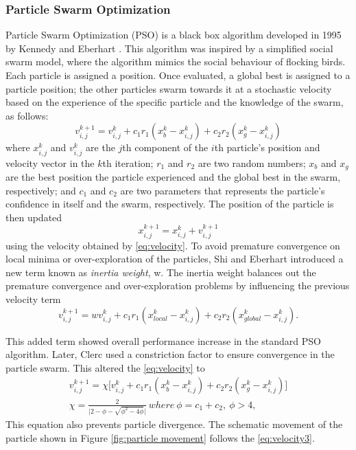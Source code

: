 \subsubsection{Particle Swarm Optimization}
Particle Swarm Optimization (PSO) is a black box algorithm developed in 1995 by Kennedy and Eberhart \cite{Kennedy1995}. This algorithm was inspired by a simplified social swarm model, where the algorithm mimics the social behaviour of flocking birds. Each particle is assigned a position. Once evaluated, a global best is assigned to a particle position; the other particles swarm towards it at a stochastic velocity based on the experience of the specific particle and the knowledge of the swarm, as follows: 
\begin{equation}
    \label{eq:velocity}
    v^{k+1}_{i,j} = v^{k}_{i,j} + c_1r_1(x^{k}_b - x^{k}_{i,j}) + c_2r_2(x^{k}_g - x^{k}_{i,j})
\end{equation}
where $x^k_{i,j}$ and $v^k_{i,j}$ are the $j$th component of the $i$th particle's position and velocity vector in the $k$th iteration; $r_1$ and $r_2$ are two random numbers; $x_b$ and $x_g$ are the best position the particle experienced and the global best in the swarm, respectively; and $c_1$ and $c_2$ are two parameters that represents the particle's confidence in itself and the swarm, respectively. The position of the particle is then updated
\begin{equation}
    \label{eq:position}
    x^{k+1}_{i,j} = x^k_{i,j} + v^{k+1}_{i,j}
\end{equation}
using the velocity obtained by \eqref{eq:velocity}. To avoid premature convergence on local minima or over-exploration of the particles, Shi and Eberhart \cite{Eberhart2000} introduced a new term known as \textit{inertia weight}, w. The inertia weight balances out the premature convergence and over-exploration problems by influencing the previous velocity term
\begin{equation}
    \label{eq:velocity2}
    v^{k+1}_{i,j} = wv^{k}_{i,j} + c_1r_1(x^{k}_{local} - x^{k}_{i,j}) + c_2r_2(x^{k}_{global} - x^{k}_{i,j}).
\end{equation}

This added term showed overall performance increase in the standard PSO algorithm. Later, Clerc \cite{Clerc1999} used a constriction factor to ensure convergence in the particle swarm. This altered the \eqref{eq:velocity} to 
\begin{align}
    \label{eq:velocity3}
    v^{k+1}_{i,j} = \chi \big[ v^{k}_{i,j} + c_1r_1(x^{k}_b - x^{k}_{i,j}) + c_2r_2(x^{k}_g - x^{k}_{i,j}) \big] \\
    \chi = \frac{2}{\big| 2- \phi - \sqrt{\phi^2 - 4\phi}\big|}\ where\ \phi = c_1 + c_2,\ \phi>4, \nonumber
\end{align}
This equation also prevents particle divergence. The schematic movement of the particle shown in Figure \ref{fig:particle movement} follows the \eqref{eq:velocity3}.

